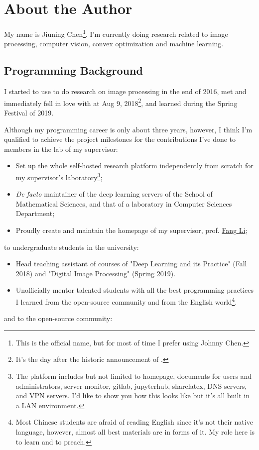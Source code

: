 
\section{About the Author}\label{sec:about_author}

My name is \textsf{Jiuning Chen}\footnote{This is the official name, but for most of time I prefer using \textsf{Johnny Chen}.}. I'm currently doing research related to image processing, computer vision, convex optimization and machine learning.\par

\subsection{Programming Background}

I started to use \langmatlab to do research on image processing in the end of 2016, met and immediately fell in love with \langjulia at Aug 9, 2018\footnote{It's the day after the historic announcement of \langjulia {}.}, and learned \langpython during the Spring Festival of 2019. \par

Although my programming career is only about three years, however, I think I'm qualified to achieve the project milestones for the contributions I've done to members in the lab of my supervisor:

\begin{itemize}
    \item Set up the whole self-hosted research platform independently from scratch for my supervisor's laboratory\footnote{The platform includes but not limited to homepage, documents for users and administrators, server monitor, gitlab, jupyterhub, sharelatex, DNS servers, and VPN servers. I'd like to show you how this looks like but it's all built in a LAN environment.};
    \item \textit{De facto} maintainer of the deep learning servers of the School of Mathematical Sciences, and that of a laboratory in Computer Sciences Department;
    \item Proudly create and maintain the homepage of my supervisor, prof. \href{http://math.ecnu.edu.cn/~fli/}{\textsf{Fang Li}};
\end{itemize}
to undergraduate students in the university:
\begin{itemize}
    \item Head teaching assistant of courses of "Deep Learning and its Practice" (Fall 2018) and "Digital Image Processing" (Spring 2019).
    \item Unofficially mentor talented students with all the best programming practices I learned from the open-source community and from the English world\footnote{Most Chinese students are afraid of reading English since it's not their native language, however, almost all best materials are in forms of it. My role here is to learn and to preach.}.
\end{itemize}
and to the open-source community:

